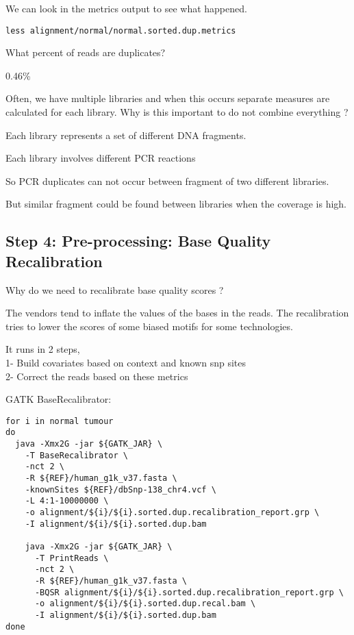 We can look in the metrics output to see what happened.

\begin{lstlisting}
less alignment/normal/normal.sorted.dup.metrics
\end{lstlisting}

\begin{questions} 
What percent of reads are duplicates?
\end{questions}
\begin{answer}
0.46\%
\end{answer}

\begin{questions} 
Often, we have multiple libraries and when this occurs separate measures are calculated for each library. Why is this important to do not combine everything ?
\end{questions}
\begin{answer}
Each library represents a set of different DNA fragments.

Each library involves different PCR reactions

So PCR duplicates can not occur between fragment of two different libraries.

But similar fragment could be found between libraries when the coverage is high.
\end{answer}


\subsection{Step 4: Pre-processing: Base Quality Recalibration}

\begin{questions}
Why do we need to recalibrate base quality scores ?
\end{questions}
\begin{answer}
The vendors tend to inflate the values of the bases in the reads.
The recalibration tries to lower the scores of some biased motifs for some technologies.
\end{answer}

It runs in 2 steps, \\
1- Build covariates based on context and known snp sites \\
2- Correct the reads based on these metrics

GATK BaseRecalibrator:

\begin{lstlisting}
for i in normal tumour
do
  java -Xmx2G -jar ${GATK_JAR} \
    -T BaseRecalibrator \
    -nct 2 \
    -R ${REF}/human_g1k_v37.fasta \
    -knownSites ${REF}/dbSnp-138_chr4.vcf \
    -L 4:1-10000000 \
    -o alignment/${i}/${i}.sorted.dup.recalibration_report.grp \
    -I alignment/${i}/${i}.sorted.dup.bam

    java -Xmx2G -jar ${GATK_JAR} \
      -T PrintReads \
      -nct 2 \
      -R ${REF}/human_g1k_v37.fasta \
      -BQSR alignment/${i}/${i}.sorted.dup.recalibration_report.grp \
      -o alignment/${i}/${i}.sorted.dup.recal.bam \
      -I alignment/${i}/${i}.sorted.dup.bam
done
\end{lstlisting}


